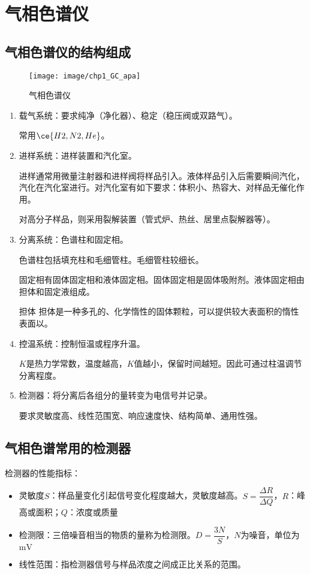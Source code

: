 \section{气相色谱仪}
\subsection{气相色谱仪的结构组成}

\begin{figure}[!h]
	\centering
	\texttt{[image: image/chp1\_GC\_apa]}
	\caption{气相色谱仪}
	\label{fig:chp1gcapa}
\end{figure}
\begin{enumerate}
	\item 载气系统：要求纯净（净化器）、稳定（稳压阀或双路气）。
	
	常用$\ce{H2,N2,He}$。
	\item 进样系统：进样装置和汽化室。
	
	进样通常用微量注射器和进样阀将样品引入。液体样品引入后需要瞬间汽化，汽化在汽化室进行。对汽化室有如下要求：体积小、热容大、对样品无催化作用。
	
	对高分子样品，则采用裂解装置（管式炉、热丝、居里点裂解器等）。
	\item 分离系统：色谱柱和固定相。
	
	色谱柱包括填充柱和毛细管柱。毛细管柱较细长。
	
	固定相有固体固定相和液体固定相。固体固定相是固体吸附剂。液体固定相由担体和固定液组成。
	
	\begin{definition*}{担体}{}
		担体是一种多孔的、化学惰性的固体颗粒，可以提供较大表面积的惰性表面以。
	\end{definition*}
	\item 控温系统：控制恒温或程序升温。
	
	$K$是热力学常数，温度越高，$K$值越小，保留时间越短。因此可通过柱温调节分离程度。
	\item 检测器：将分离后各组分的量转变为电信号并记录。
	
	要求灵敏度高、线性范围宽、响应速度快、结构简单、通用性强。
\end{enumerate}

\subsection{气相色谱常用的检测器}
检测器的性能指标：
\begin{itemize}
	\item 灵敏度$S$：样品量变化引起信号变化程度越大，灵敏度越高。$S=\dfrac{\Delta R}{\Delta  Q}$，$R$：峰高或面积；$Q$：浓度或质量
	\item 检测限：三倍噪音相当的物质的量称为检测限。$D=\dfrac{3N}{S}$，$N$为噪音，单位为$\mathrm{mV}$
	\item 线性范围：指检测器信号与样品浓度之间成正比关系的范围。
\end{itemize}

